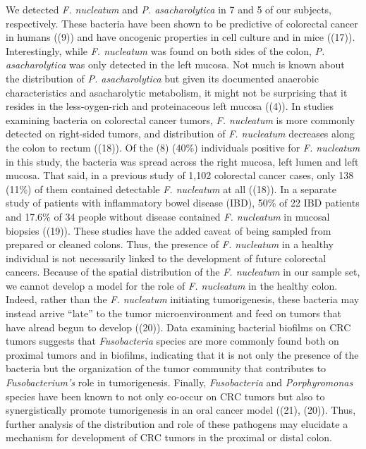 \documentclass[11pt,]{article}
\begin{document}
We detected \emph{F. nucleatum} and \emph{P. asacharolytica} in 7 and 5
of our subjects, respectively. These bacteria have been shown to be
predictive of colorectal cancer in humans ((9)) and have oncogenic
properties in cell culture and in mice ((17)). Interestingly, while
\emph{F. nucleatum} was found on both sides of the colon, \emph{P.
asacharolytica} was only detected in the left mucosa. Not much is known
about the distribution of \emph{P. asacharolytica} but given its
documented anaerobic characteristics and asacharolytic metabolism, it
might not be surprising that it resides in the less-oygen-rich and
proteinaceous left mucosa ((4)). In studies examining bacteria on
colorectal cancer tumors, \emph{F. nucleatum} is more commonly detected
on right-sided tumors, and distribution of \emph{F. nucleatum} decreases
along the colon to rectum ((18)). Of the (8) (40\%) individuals positive
for \emph{F. nucleatum} in this study, the bacteria was spread across
the right mucosa, left lumen and left mucosa. That said, in a previous
study of 1,102 colorectal cancer cases, only 138 (11\%) of them
contained detectable \emph{F. nucleatum} at all ((18)). In a separate
study of patients with inflammatory bowel disease (IBD), 50\% of 22 IBD
patients and 17.6\% of 34 people without disease contained \emph{F.
nucleatum} in mucosal biopsies ((19)). These studies have the added
caveat of being sampled from prepared or cleaned colons. Thus, the
presence of \emph{F. nucleatum} in a healthy individual is not
necessarily linked to the development of future colorectal cancers.
Because of the spatial distribution of the \emph{F. nucleatum} in our
sample set, we cannot develop a model for the role of \emph{F.
nucleatum} in the healthy colon. Indeed, rather than the \emph{F.
nucleatum} initiating tumorigenesis, these bacteria may instead arrive
``late'' to the tumor microenvironment and feed on tumors that have
alread begun to develop ((20)). Data examining bacterial biofilms on CRC
tumors suggests that \emph{Fusobacteria} species are more commonly found
both on proximal tumors and in biofilms, indicating that it is not only
the presence of the bacteria but the organization of the tumor community
that contributes to \emph{Fusobacterium's} role in tumorigenesis.
Finally, \emph{Fusobacteria} and \emph{Porphyromonas} species have been
known to not only co-occur on CRC tumors but also to synergistically
promote tumorigenesis in an oral cancer model ((21), (20)). Thus,
further analysis of the distribution and role of these pathogens may
elucidate a mechanism for development of CRC tumors in the proximal or
distal colon.
\end{document}
